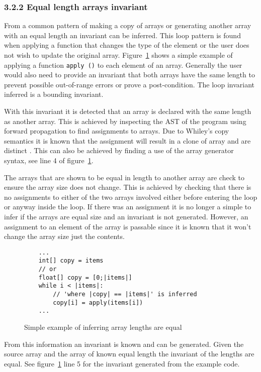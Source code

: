 \documentclass[11pt, a4paper, twoside, openright]{report}
\newcommand{\code}[1]{\texttt{#1}}
\begin{document}
\subsubsection*{3.2.2 Equal length arrays invariant}

From a common pattern of making a copy of arrays or generating another array
with an equal length an invariant can be inferred.
This loop pattern is found when applying a function that changes the type of
the element or the user does not wish to update the original array.
Figure~\ref{lst:whiley-length} shows a simple example of applying a function
\code{apply ()} to each element of an array.
Generally the user would also need to provide an invariant that both arrays
have the same length to prevent possible out-of-range errors or prove a
post-condition.
The loop invariant inferred is a bounding invariant.

With this invariant it is detected that an array is declared with the same
length as another array.
This is achieved by inspecting the AST of the program
using forward propagation to find assignments to arrays.
Due to Whiley's copy semantics it is known that the assignment will result
in a clone of array and are distinct \cite{whiley-origin} \cite{whiley-arrays}.
This can also be achieved by finding a use of the array
generator syntax, see line 4 of figure~\ref{lst:whiley-length}.

The arrays that are shown to be equal in length to another array are
check to ensure the array size does not change.
This is achieved by checking that there is no assignments to either
of the two arrays involved either before entering the loop or
anyway inside the loop.
If there was an assignment it is no longer a simple to infer if
the arrays are equal size and an invariant is not generated.
However, an assignment to an element of the array is passable since it
is known that it won't change the array size just the contents.

\begin{figure}[ht]
\begin{lstlisting}
    ...
    int[] copy = items
    // or
    float[] copy = [0;|items|]
    while i < |items|:
        // 'where |copy| == |items|' is inferred
        copy[i] = apply(items[i])
    ...
\end{lstlisting}
\caption{Simple example of inferring array lengths are equal}
\label{lst:whiley-length}
\end{figure}

From this information an invariant is known and can be generated.
Given the source array and the array of known equal length the
invariant of the lengths are equal.
See figure~\ref{lst:whiley-length} line 5 for the invariant generated
from the example code.
\end{document}
